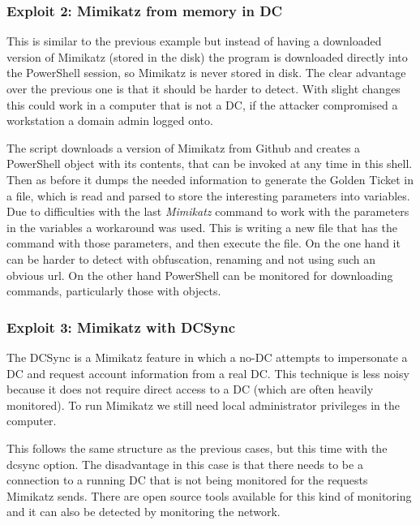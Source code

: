 \subsubsection{Exploit 2: Mimikatz from memory in DC} \label{invoke-Mimikatz}
This is similar to the previous example but instead of having a downloaded version of Mimikatz (stored in the disk) the program is downloaded directly into the PowerShell session, so Mimikatz is never stored in disk.
The clear advantage over the previous one is that it should be harder to detect.
\linej
With slight changes this could work in a computer that is not a DC, if the attacker compromised a workstation a domain admin logged onto\cite{dump_ways}.
\linej

\linej
The script downloads a version of Mimikatz from Github and creates a PowerShell object with its contents, that can be invoked at any time in this shell\cite{powersploit}\cite{mimikatz_details}. Then as before it dumps the needed information to generate the Golden Ticket in a file, which is read and parsed to store the interesting parameters into variables.
\linej
Due to difficulties with the last \textit{Mimikatz} command to work with the parameters in the variables a workaround was used. This is writing a new file that has the command with those parameters, and then execute the file.
\linej
\linej
On the one hand it can be harder to detect with obfuscation, renaming and not using such an obvious url.
On the other hand PowerShell can be monitored for downloading commands, particularly those with objects.

\subsubsection{Exploit 3: Mimikatz with DCSync}
The DCSync is a Mimikatz feature in which a no-DC attempts to impersonate a DC and request account information from a real DC. This technique is less noisy because it does not require direct access to a DC (which are often heavily monitored)\cite{dump_ways}\cite{pentestlab}. To run Mimikatz we still need local administrator privileges in the computer.
\linej

\linej
This follows the same structure as the previous cases, but this time with the dcsync option.
The disadvantage in this case is that there needs to be a connection to a running DC that is not being monitored for the requests Mimikatz sends. There are open source tools available for this kind of monitoring\cite{dcsync_monitor} and it can also be detected by monitoring the network\cite{dcsync_monitor_network}.

